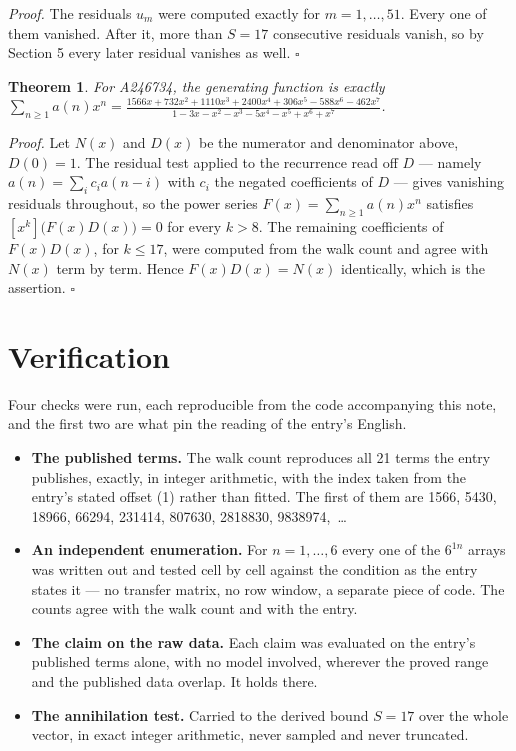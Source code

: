 \documentclass[11pt]{article}
\newtheorem{theorem}{Theorem}
\theoremstyle{definition}
\begin{document}
{\itshape Proof.} The residuals $u_m$ were computed exactly for $m = 1,\dots,51$. Every one of them vanished. After it, more than $S = 17$ consecutive residuals vanish, so by Section 5 every later residual vanishes as well. $\square$

\begin{theorem} For A246734, the generating function is exactly $\sum_{n\ge 1} a(n)x^n = \frac{1566x + 732x^{2} + 1110x^{3} + 2400x^{4} + 306x^{5} - 588x^{6} - 462x^{7}}{1 - 3x - x^{2} - x^{3} - 5x^{4} - x^{5} + x^{6} + x^{7}}$.\end{theorem}

{\itshape Proof.} Let $N(x)$ and $D(x)$ be the numerator and denominator above, $D(0)=1$. The residual test applied to the recurrence read off $D$ --- namely $a(n) = \sum_i c_i a(n-i)$ with $c_i$ the negated coefficients of $D$ --- gives vanishing residuals throughout, so the power series $F(x)=\sum_{n\ge 1}a(n)x^n$ satisfies $[x^k]\bigl(F(x)D(x)\bigr) = 0$ for every $k > 8$. The remaining coefficients of $F(x)D(x)$, for $k \le 17$, were computed from the walk count and agree with $N(x)$ term by term. Hence $F(x)D(x) = N(x)$ identically, which is the assertion. $\square$

\section{Verification}

Four checks were run, each reproducible from the code accompanying this note, and the first two are what pin the reading of the entry's English.

\begin{itemize}

\item {\bfseries The published terms.} The walk count reproduces all 21 terms the entry publishes, exactly, in integer arithmetic, with the index taken from the entry's stated offset (1) rather than fitted. The first of them are 1566, 5430, 18966, 66294, 231414, 807630, 2818830, 9838974,~\dots

\item {\bfseries An independent enumeration.} For $n = 1,\dots,6$ every one of the $6^{1n}$ arrays was written out and tested cell by cell against the condition as the entry states it --- no transfer matrix, no row window, a separate piece of code. The counts agree with the walk count and with the entry.

\item {\bfseries The claim on the raw data.} Each claim was evaluated on the entry's published terms alone, with no model involved, wherever the proved range and the published data overlap. It holds there.

\item {\bfseries The annihilation test.} Carried to the derived bound $S = 17$ over the whole vector, in exact integer arithmetic, never sampled and never truncated.

\end{itemize}
\end{document}
